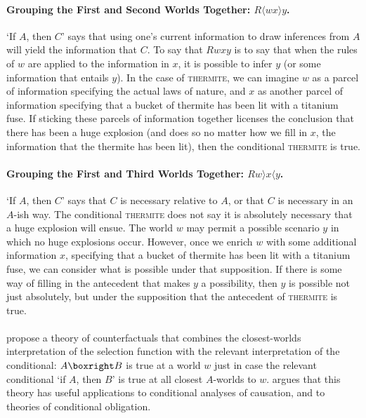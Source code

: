 \paragraph{Grouping the First and Second Worlds Together: $R\langle wx \rangle y$.} `If $A$, then $C$' says that using one's current information to draw inferences from $A$ will yield the information that $C$.  To say that $Rwxy$ is to say that when the rules of $w$ are applied to the information in $x$, it is possible to infer $y$ (or some information that entails $y$). In the case of \textsc{thermite}, we can imagine $w$ as a parcel of information specifying the actual laws of nature, and $x$ as another parcel of information specifying that a bucket of thermite has been lit with a titanium fuse.  If sticking these parcels of information together licenses the conclusion that there has been a huge explosion (and does so no matter how we fill in $x$, the information that the thermite has been lit), then the conditional \textsc{thermite} is true.

\paragraph{Grouping the First and Third Worlds Together: $R w\rangle x \langle y$.} `If $A$, then $C$' says that $C$ is necessary relative to $A$, or that $C$ is necessary in an $A$-ish way.  The conditional \textsc{thermite} does not say it is absolutely necessary that a huge explosion will ensue. The world $w$ may permit a possible scenario $y$ in which no huge explosions occur.  However, once we enrich $w$ with some additional information $x$, specifying that a bucket of thermite has been lit with a titanium fuse, we can consider what is possible under that supposition.  If there is some way of filling in the antecedent that makes $y$ a possibility, then $y$ is possible not just absolutely, but under the supposition that the antecedent of \textsc{thermite} is true.

\paragraph{}
\citet{Mares1995-MARART-2} propose a theory of counterfactuals that combines the closest-worlds interpretation of the selection function with the relevant interpretation of the conditional: $A \boxright B$ is true at a world $w$ just in case the relevant conditional `if $A$, then $B$' is true at all closest $A$-worlds to $w$.  \citet{Mares1994-MARWWN} argues that this theory has useful applications to conditional analyses of causation, and to theories of conditional obligation.

